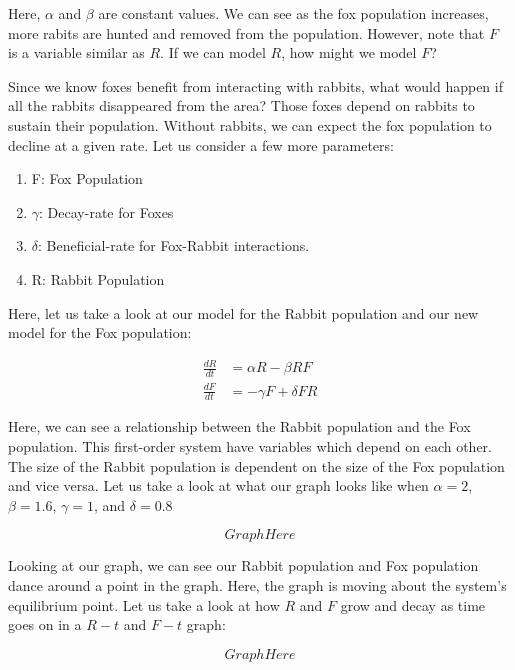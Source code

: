 \documentclass{amsart}
\theoremstyle{definition}
\numberwithin{equation}{section}
\begin{document}
\begin{sansmath}
Here, $\alpha$ and $\beta$ are constant values. We can see as the fox population increases, more rabits are hunted and removed from the population. However, note that $F$ is a variable similar as $R$. If we can model $R$, how might we model $F$?

Since we know foxes benefit from interacting with rabbits, what would happen if all the rabbits disappeared from the area? Those foxes depend on rabbits to sustain their population. Without rabbits, we can expect the fox population to decline at a given rate. Let us consider a few more parameters:

\begin{enumerate}
  \item F: Fox Population
  \item $\gamma$: Decay-rate for Foxes
  \item $\delta$: Beneficial-rate for Fox-Rabbit interactions.
  \item R: Rabbit Population
\end{enumerate}

Here, let us take a look at our model for the Rabbit population and our new model for the Fox population:

\begin{align}
  \frac{dR}{dt} & = \alpha R - \beta RF\\
  \frac{dF}{dt} & = -\gamma F + \delta FR
\end{align}

Here, we can see a relationship between the Rabbit population and the Fox population. This first-order system have variables which depend on each other. The size of the Rabbit population is dependent on the size of the Fox population and vice versa.
Let us take a look at what our graph looks like when $\alpha = 2$, $\beta = 1.6$, $\gamma = 1$, and $\delta = 0.8$

\[ Graph Here \]

Looking at our graph, we can see our Rabbit population and Fox population dance around a point in the graph. Here, the graph is moving about the system's equilibrium point. Let us take a look at how $R$ and $F$ grow and decay as time goes on in a $R-t$ and $F-t$ graph:

\[ Graph Here \]


\end{sansmath}
\end{document}
